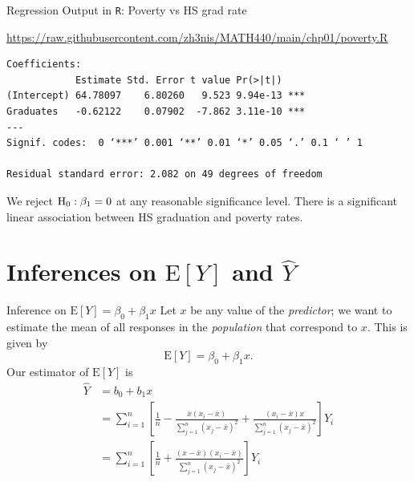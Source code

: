 \documentclass{beamer}
\newcommand{\E}{\mathrm{E}}
\begin{document}
\begin{frame}[fragile]{Regression Output in \texttt{R}: Poverty vs HS grad rate}

{\color{blue} \url{https://raw.githubusercontent.com/zh3nis/MATH440/main/chp01/poverty.R}}
\begin{small}
\begin{verbatim}
Coefficients:
            Estimate Std. Error t value Pr(>|t|)    
(Intercept) 64.78097    6.80260   9.523 9.94e-13 ***
Graduates   -0.62122    0.07902  -7.862 3.11e-10 ***
---
Signif. codes:  0 ‘***’ 0.001 ‘**’ 0.01 ‘*’ 0.05 ‘.’ 0.1 ‘ ’ 1

Residual standard error: 2.082 on 49 degrees of freedom
\end{verbatim}
\end{small}
\pause We reject $\rm{H}_0:\beta_1=0$ at any reasonable significance level. There is a significant linear association between HS graduation and poverty rates.
\end{frame}

\section{Inferences on $\E[Y]$ and $\hat{Y}$}

\begin{frame}{Inference on $\E[Y]=\beta_0+\beta_1 x$}
Let $x$ be any value of the \textit{predictor}; we want to estimate the mean of all responses in the \textit{population} that correspond to $x$. This is given by
$$
\E[Y]=\beta_0+\beta_1 x.
$$
Our estimator of $\E[Y]$ is
\begin{align*}
\hat{Y}&=b_0+b_1 x\\
&=\sum_{i=1}^n\left[\frac1n-\frac{\bar{x}(x_i-\bar{x})}{\sum_{j=1}^n(x_j-\bar{x})^2}+\frac{(x_i-\bar{x})x}{\sum_{j=1}^n(x_j-\bar{x})^2}\right]Y_i\\
&=\sum_{i=1}^n\left[\frac1n+\frac{(x-\bar{x})(x_i-\bar{x})}{\sum_{j=1}^n(x_j-\bar{x})^2}\right]Y_i
\end{align*}
\end{frame}
\end{document}
